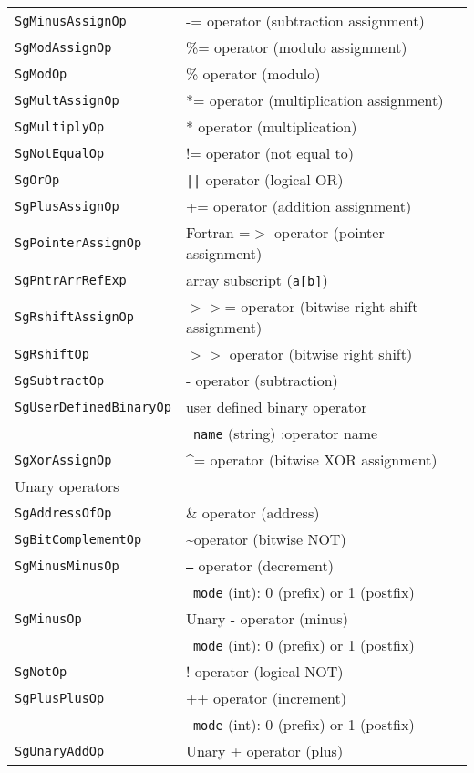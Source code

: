\begin{longtable}[l]{l|p{10cm}}
 \texttt{SgMinusAssignOp} & -= operator (subtraction assignment) \\
 \texttt{SgModAssignOp} & \%= operator (modulo assignment)\\
 \texttt{SgModOp} & \% operator (modulo) \\
 \texttt{SgMultAssignOp} & *= operator (multiplication assignment)\\
 \texttt{SgMultiplyOp} & * operator (multiplication)\\
 \texttt{SgNotEqualOp} & != operator (not equal to)\\
 \texttt{SgOrOp} & \texttt{||} operator (logical OR)\\
 \texttt{SgPlusAssignOp} & += operator (addition assignment)\\
 \texttt{SgPointerAssignOp} & Fortran =$>$ operator (pointer assignment) \\
 \texttt{SgPntrArrRefExp} & array subscript (\texttt{a[b]})\\
 \texttt{SgRshiftAssignOp} & $>>$= operator (bitwise right shift assignment)\\
 \texttt{SgRshiftOp} & $>>$ operator (bitwise right shift)\\
 \texttt{SgSubtractOp} & - operator (subtraction)\\
 \texttt{SgUserDefinedBinaryOp} & user defined binary operator\\
 & ~\texttt{name} (string) :operator name \\
 \texttt{SgXorAssignOp} & \^{}= operator (bitwise XOR assignment)\\
 \hline
 \multicolumn{2}{l}{Unary operators}\\
 \hline
 \texttt{SgAddressOfOp} & \& operator (address)\\
 \texttt{SgBitComplementOp} & \textasciitilde operator (bitwise NOT)\\
 \texttt{SgMinusMinusOp} & \texttt{--} operator (decrement)\\
 & ~\texttt{mode} (int): 0 (prefix) or 1 (postfix)\\
 \texttt{SgMinusOp} & Unary - operator (minus)\\
 & ~\texttt{mode} (int): 0 (prefix) or 1 (postfix)\\
 \texttt{SgNotOp} & ! operator (logical NOT)\\
 \texttt{SgPlusPlusOp} & ++ operator (increment)\\
 & ~\texttt{mode} (int): 0 (prefix) or 1 (postfix)\\
 \texttt{SgUnaryAddOp} & Unary + operator (plus)\\

\end{longtable}
